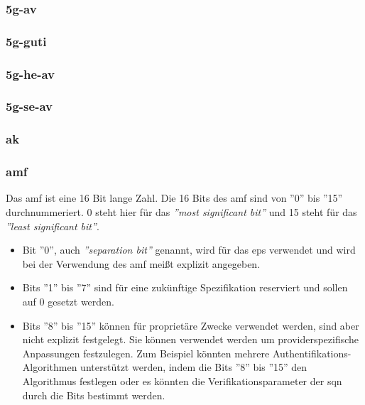 \subsubsection{\gls{5g-av}}

\subsubsection{\gls{5g-guti}}

\subsubsection{\gls{5g-he-av}}

\subsubsection{\gls{5g-se-av}}

\subsubsection{\gls{ak}}

\subsubsection{\gls{amf}}
Das \gls{amf} ist eine 16 Bit lange Zahl. %
Die 16 Bits des \gls{amf} sind von ''0'' bis ''15'' durchnummeriert. %
0 steht hier f\"ur das \textit{''most significant bit''} und 15 steht f\"ur das \textit{''least significant bit''}.

\begin{itemize}
\item Bit ''0'', auch \textit{''separation bit''} genannt, wird f\"ur das \gls{eps} verwendet und wird bei der Verwendung des \gls{amf} mei{\ss}t explizit angegeben. \\
\item Bits ''1'' bis ''7'' sind f\"ur eine zuk\"unftige Spezifikation reserviert und sollen auf 0 gesetzt werden. \\
\item Bits ''8'' bis ''15'' k\"onnen f\"ur propriet\"are Zwecke verwendet werden, sind aber nicht explizit festgelegt. 
Sie k\"onnen verwendet werden um providerspezifische Anpassungen festzulegen.
Zum Beispiel k\"onnten mehrere Authentifikations-Algorithmen unterst\"utzt werden, indem die Bits ''8'' bis ''15'' den Algorithmus festlegen oder es k\"onnten die Verifikationsparameter der \gls{sqn} durch die Bits bestimmt werden. %
\end{itemize}

